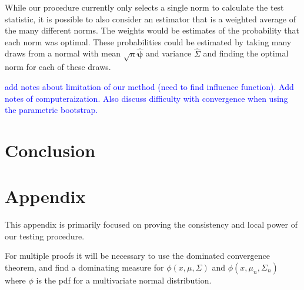 \documentclass{article}
\begin{document}
While our procedure currently only selects a single norm to calculate the test statistic, it is possible to also consider an estimator that is a weighted average of the many different norms.  The weights would be estimates of the probability that each norm was optimal. These probabilities could be estimated by taking many draws from a normal with mean $\sqrt{n}\hat{\boldsymbol{\psi}}$ and variance $\hat{\Sigma}$ and finding the optimal norm for each of these draws.  


\textcolor{blue}{add notes about limitation of our method (need to find influence function).  Add notes of computeraization.  Also discuss difficulty with convergence when using the parametric bootstrap.}


\section{Conclusion}

\section{Appendix}
This appendix is primarily focused on proving the consistency and local power of our testing procedure.  

For multiple proofs it will be necessary to use the dominated convergence theorem, and find a dominating measure for $\phi(x, \mu, \Sigma)$ and $\phi(x, \mu_n, \Sigma_n)$ where $\phi$ is the pdf for a multivariate normal distribution.
\end{document}
